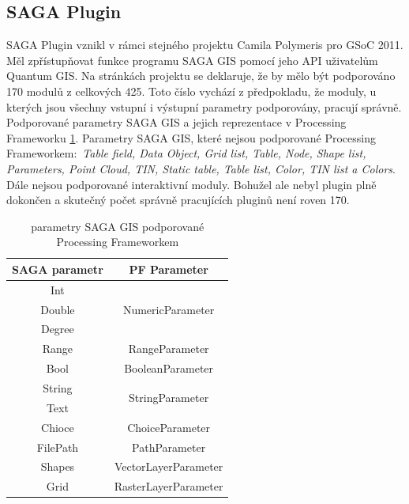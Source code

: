 \subsection{SAGA Plugin}
SAGA Plugin vznikl v rámci stejného projektu Camila Polymeris pro GSoC 2011. Měl zpřístupňovat funkce programu SAGA GIS pomocí jeho API uživatelům Quantum GIS. Na stránkách projektu \cite{pf:supportedModules} se deklaruje, že by mělo být podporováno 170 modulů z celkových 425. Toto číslo vychází z předpokladu, že moduly, u kterých jsou všechny vstupní i výstupní parametry podporovány, pracují správně. Podporované parametry SAGA GIS a jejich reprezentace v Processing Frameworku \ref{tab:saga_parameters}. Parametry SAGA GIS, které nejsou podporované Processing Frameworkem$:$ \textit{Table field, Data Object, Grid list, Table, Node, Shape list, Parameters, Point Cloud, TIN, Static table, Table list, Color, TIN list a Colors}. Dále nejsou podporované interaktivní moduly. Bohužel ale nebyl plugin plně dokončen a skutečný počet správně pracujících pluginů není roven 170. \\

\begin{table}[h]
	\centering
	\begin{tabular}{|c|c|}
		\hline
		\textbf{SAGA parametr} & \textbf{PF Parameter} \\
		\hline
		\hline
		Int & \multirow{3}{*}{NumericParameter}\\
		Double & \\
		Degree & \\
		\hline				
		Range & RangeParameter\\	
		\hline
		Bool & BooleanParameter\\		
		\hline
		String & \multirow{2}{*}{StringParameter}\\
		Text & \\
		\hline
		Chioce & ChoiceParameter\\
		\hline
		FilePath & PathParameter\\
		\hline
		Shapes & VectorLayerParameter\\
		\hline
		Grid & RasterLayerParameter\\		
		\hline	
	\end{tabular}
	\caption{parametry SAGA GIS podporované Processing Frameworkem}
	\label{tab:saga_parameters}
\end{table}




